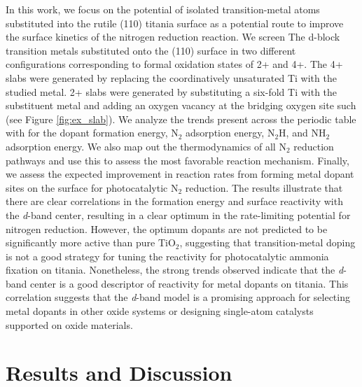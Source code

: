 In this work, we focus on the potential of isolated transition-metal atoms substituted into the rutile (110) titania surface as a potential route to improve the surface kinetics of the nitrogen reduction reaction. We screen The d-block transition metals substituted onto the (110) surface in two different configurations corresponding to formal oxidation states of 2+ and 4+. The 4+ slabs were generated by replacing the coordinatively unsaturated Ti with the studied metal. 2+ slabs were generated by substituting a six-fold Ti with the substituent metal and adding an oxygen vacancy at the bridging oxygen site such (see Figure \ref{fig:ex_slab}). We analyze the trends present across the periodic table with for the dopant formation energy, N$_2$ adsorption energy, N$_2$H, and NH$_2$ adsorption energy. We also map out the thermodynamics of all N$_2$ reduction pathways and use this to assess the most favorable reaction mechanism. Finally, we assess the expected improvement in reaction rates from forming metal dopant sites on the surface for photocatalytic N$_2$ reduction. The results illustrate that there are clear correlations in the formation energy and surface reactivity with the \textit{d}-band center, resulting in a clear optimum in the rate-limiting potential for nitrogen reduction. However, the optimum dopants are not predicted to be significantly more active than pure TiO$_2$, suggesting that transition-metal doping is not a good strategy for tuning the reactivity for photocatalytic ammonia fixation on titania. Nonetheless, the strong trends observed indicate that the \textit{d}-band center is a good descriptor of reactivity for metal dopants on titania. This correlation suggests that the \textit{d}-band model is a promising approach for selecting metal dopants in other oxide systems or designing single-atom catalysts supported on oxide materials.

\section{Results and Discussion}

